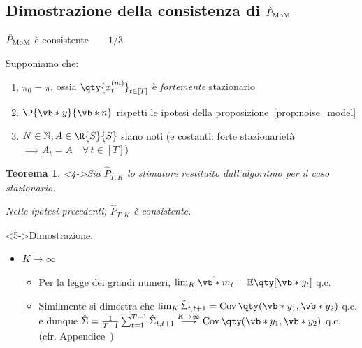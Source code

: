 \documentclass[10pt,xcolor={table,dvipsnames}]{beamer} 		%
\theoremstyle{plain}					%
\newtheorem{teorema}{Teorema}%
\theoremstyle{definition}
\theoremstyle{remark}
\newcommand{\Cov}[1]{\operatorname{Cov}\qty(#1)}
\begin{document}
	\subsection{Dimostrazione della consistenza di \texorpdfstring{$\hat{P}_{\textup{MoM}}$}{P_mom}}

	\begin{frame}
        {\hypertarget{frame:teorema_1_part1}{$\hat{P}_{\textup{MoM}}$ è consistente$\qquad 1/3$}}

        Supponiamo che:
        \begin{enumerate}
            \item $\pi_0=\pi$, ossia $\qty{x_t^{(m)}}_{t\in[T]}$ è \emph{fortemente} stazionario
            \item<2-> $\P{\vb*{y}}{\vb*{n}}$ rispetti le ipotesi della proposizione~\ref{prop:noise_model}
            \item<3-> $N\in\mathbb{N}, A\in\R{S}{S}$ siano noti {\smaller (e costanti: forte stazionarietà $\implies A_t=A\quad\forall\,t\in[T]$)}
        \end{enumerate}

        \begin{teorema}<4->\label{teor:consistenza_P_mom}
            Sia $\hat{P}_{T,K}$ lo stimatore restituito dall'algoritmo per il caso stazionario.

            Nelle ipotesi precedenti, $\hat{P}_{T,K}$ è consistente.%
        \end{teorema}
        \begin{block}<5->{Dimostrazione.}
            \begin{itemize}
                \item ${K\to\infty}$
                \begin{itemize}
                    \item<5-> Per la legge dei grandi numeri, $\lim_K\hat{\vb*{m}}_t=\mathbb{E}\qty[\vb*{y}_t]$ q.c.
                    \item<7-> Similmente si dimostra che $\lim_K\hat{\Sigma}_{t,t+1}=\Cov{\vb*{y}_1,\vb*{y}_2}$ q.c.
                    e dunque $\hat{\Sigma}=\frac{1}{T-1}\sum_{t=1}^{T-1}\hat{\Sigma}_{t,t+1}\overset{K\to\infty}{\longrightarrow}\Cov{\vb*{y}_1,\vb*{y}_2}$ q.c.
                    (cfr. Appendice~\hyperlink{frame:teorema1_lim_Sigmahat:appendice}{\faHandPointRight})
                \end{itemize}
            \end{itemize}
        \end{block}
    \end{frame}
\end{document}
